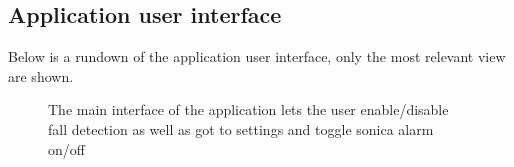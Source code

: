 \documentclass[12pt, a4paper, onecolumn]{article}
\begin{document}
\subsection{Application user interface}

	Below is a rundown of the application user interface, only the most relevant view are shown.

	\begin{figure}[H]
		\centering
		\caption{The main interface of the application lets the user enable/disable fall detection as well as got to settings and toggle sonica alarm on/off}%
		\label{fig:main-screen}%
	\end{figure}
\end{document}
